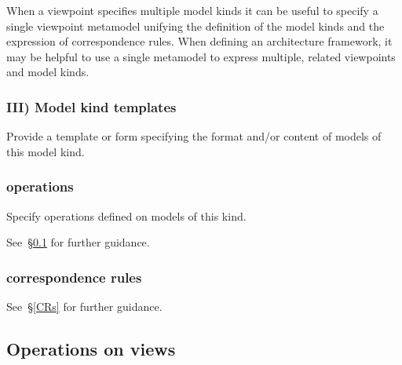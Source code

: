 When a viewpoint specifies multiple model kinds it can be useful to
specify a single viewpoint metamodel unifying the definition of the
model kinds and the expression of correspondence rules.  When defining
an architecture framework, it may be helpful to use a single metamodel
to express multiple, related viewpoints and model kinds.



\subsubsection*{III) Model kind templates \Optional}

Provide a template or form specifying the format and/or content of
models of this model kind.



\subsubsection{ operations \Optional} 

Specify operations defined on models of this kind.

See~\S\ref{Opns} for further guidance.


\subsubsection{ correspondence rules}


See~\S\ref{CRs} for further guidance.


\subsection{Operations on views}\label{Opns}

